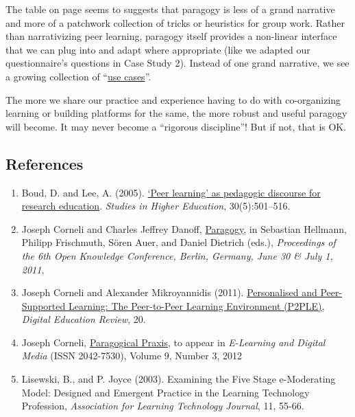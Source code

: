 The table on page \pageref{principle-table} seems to suggests that
paragogy is less of a grand narrative and more of a patchwork
collection of tricks or heuristics for group work. Rather than
narrativizing peer learning, paragogy itself provides a non-linear
interface that we can plug into and adapt where appropriate (like we
adapted our questionnaire's questions in Case Study 2). Instead of one
grand narrative, we see a growing collection of
``\href{http://socialmediaclassroom.com/host/peeragogy/wiki/patterns-and-use-cases}{use
  cases}''. 

The more we share our practice and experience having to do
with co-organizing learning or building platforms for the same, the
more robust and useful paragogy will become. It may never become
a ``rigorous discipline''! But if not, that is OK.

\subsection{References}

\begin{enumerate}
\item
  Boud, D. and Lee, A. (2005).
  \href{http://manainkblog.typepad.com/faultlines/files/BoudLee2005.pdf}{`Peer
  learning' as pedagogic discourse for research education}.
  \emph{Studies in Higher Education}, 30(5):501--516.
\item
  Joseph Corneli and Charles Jeffrey Danoff,
  \href{http://ceur-ws.org/Vol-739/paper\_5.pdf}{Paragogy}, in Sebastian
  Hellmann, Philipp Frischmuth, Sören Auer, and Daniel Dietrich (eds.),
  \emph{Proceedings of the 6th Open Knowledge Conference, Berlin,
  Germany, June 30 \& July 1, 2011},
\item
  Joseph Corneli and Alexander Mikroyannidis (2011).
  \href{http://greav.ub.edu/der/index.php/der/article/view/188/330}{Personalised
  and Peer-Supported Learning: The Peer-to-Peer Learning Environment
  (P2PLE)}, \emph{Digital Education Review}, 20.
\item
  Joseph Corneli,
  \href{http://paragogy.net/ParagogicalPraxisPaper}{Paragogical Praxis},
  to appear in \emph{E-Learning and Digital Media} (ISSN 2042-7530),
  Volume 9, Number 3, 2012
\item
  Lisewski, B., and P. Joyce (2003). Examining the Five Stage
  e-Moderating Model: Designed and Emergent Practice in the Learning
  Technology Profession, \emph{Association for Learning Technology
  Journal}, 11, 55-66.
\end{enumerate}
